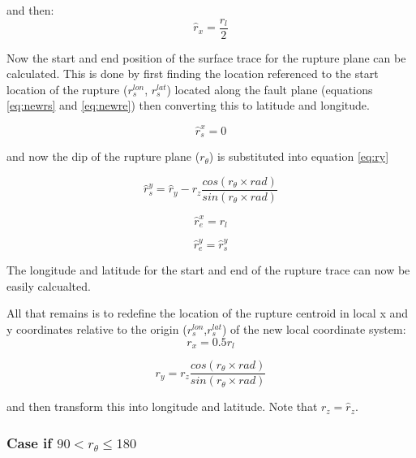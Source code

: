 and then:
\begin{equation}
\hat{r}_x = \frac{r_l}{2}
\end{equation}

Now the start and end position of the surface trace for the rupture plane can be calculated. This is done by first 
finding the location referenced to the start location of the rupture ($r_s^{lon}$, $r_s^{lat}$) located along the fault 
plane (equations \ref{eq:newrs} and \ref{eq:newre}) then converting this to latitude and longitude.

\begin{equation}\label{eq:rsx}
\hat{r}_s^{x} = 0
\end{equation}

and now the dip of the rupture plane ($r_\theta$) is substituted into equation \ref{eq:ry}

\begin{equation}
\hat{r}_s^{y} = \hat{r}_y - r_z  \frac{cos(r_\theta \times rad)}{sin(r_\theta \times rad)}
\end{equation}

\begin{equation}\label{eq:rex}
\hat{r}_e^{x} = r_l
\end{equation}

\begin{equation}\label{eq:rey}
\hat{r}_e^{y} = \hat{r}_s^{y}
\end{equation}

The longitude and latitude for the start and end of the rupture trace can now be easily calcualted.


All that remains is to redefine the location of the rupture centroid in local x and y coordinates relative to the origin 
($r_s^{lon}$,$ r_s^{lat}$) of the new local coordinate system:
\begin{equation}\label{eq:rx}
r_x = 0.5 r_l
\end{equation}

\begin{equation}
r_y = r_z  \frac{cos(r_\theta \times rad)}{sin(r_\theta \times rad)}
\end{equation}

and then transform this into longitude and latitude. Note that $r_z = \hat{r}_z$.

\subsubsection{Case if $90 <  r_\theta \leq 180$} \label{sec:90t180}

